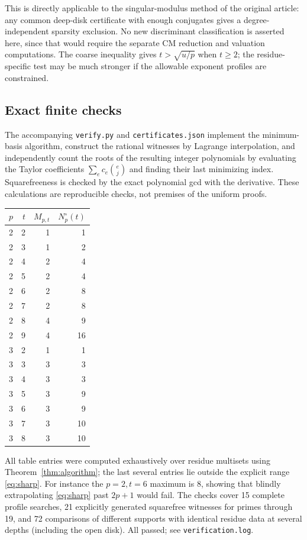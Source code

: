 \documentclass[11pt]{article}
\theoremstyle{remark}\newtheorem{remark}[theorem]{Remark}
\begin{document}
This is directly applicable to the singular-modulus method of the original article:
any common deep-disk certificate with enough conjugates gives a degree-independent
sparsity exclusion. No new discriminant classification is asserted here, since that
would require the separate CM reduction and valuation computations. The coarse
inequality gives $t>\sqrt{u/p}$ when $t\ge2$; the residue-specific test may be much
stronger if the allowable exponent profiles are constrained.

\subsection{Exact finite checks}

The accompanying \texttt{verify.py} and \texttt{certificates.json} implement the
minimum-basis algorithm, construct the rational witnesses by Lagrange interpolation,
and independently count the roots of the resulting integer polynomials by evaluating
the Taylor coefficients $\sum_e c_e\binom ej$ and finding their last minimizing index.
Squarefreeness is checked by the exact polynomial gcd with the derivative. These
calculations are reproducible checks, not premises of the uniform proofs.

\begin{center}
\begin{tabular}{@{}rrrr@{}}
\toprule
$p$&$t$&$M_{p,t}$&$N_p^\circ(t)$\\
\midrule
2&2&1&1\\
2&3&1&2\\
2&4&2&4\\
2&5&2&4\\
2&6&2&8\\
2&7&2&8\\
2&8&4&9\\
2&9&4&16\\
\midrule
3&2&1&1\\
3&3&3&3\\
3&4&3&3\\
3&5&3&9\\
3&6&3&9\\
3&7&3&10\\
3&8&3&10\\
\bottomrule
\end{tabular}
\end{center}
All table entries were computed exhaustively over residue multisets using
Theorem~\ref{thm:algorithm}; the last several entries lie outside the explicit range
\eqref{eq:sharp}. For instance the $p=2,t=6$ maximum is $8$, showing that blindly
extrapolating \eqref{eq:sharp} past $2p+1$ would fail. The checks cover 15 complete
profile searches, 21 explicitly generated squarefree witnesses for primes through 19,
and 72 comparisons of different supports with identical residue data at several
depths (including the open disk). All passed; see \texttt{verification.log}.
\end{document}
